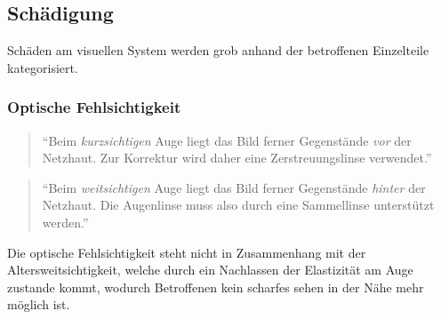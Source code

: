 \subsection{Schädigung}
Schäden am visuellen System werden grob anhand der betroffenen Einzelteile kategorisiert.

\subsubsection{Optische Fehlsichtigkeit}
\begin{quote}
\enquote{Beim \textit{kurzsichtigen} Auge liegt das Bild ferner Gegenstände \textit{vor} der Netzhaut. Zur Korrektur wird daher eine Zerstreuungslinse verwendet.} \cite[S. 236]{physik1}
\end{quote}

\begin{quote}
\enquote{Beim \textit{weitsichtigen} Auge liegt das Bild ferner Gegenstände \textit{hinter} der Netzhaut. Die Augenlinse muss also durch eine Sammellinse unterstützt werden.} \cite[S. 237]{physik1}
\end{quote}

Die optische Fehlsichtigkeit steht nicht in Zusammenhang mit der Altersweitsichtigkeit, welche durch ein Nachlassen der Elastizität am Auge zustande kommt, wodurch Betroffenen kein scharfes sehen in der Nähe mehr möglich ist.
